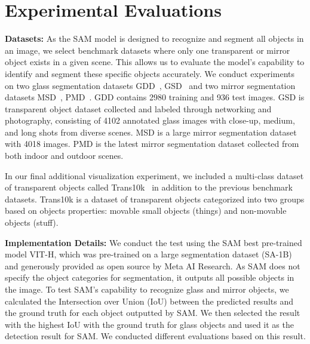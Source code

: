 \documentclass{article}
\begin{document}

\section{Experimental Evaluations}
\textbf{Datasets:}
As the SAM model is designed to recognize and segment all objects in an image, we select benchmark datasets where only one transparent or mirror object exists in a given scene. This allows us to evaluate the model's capability to identify and segment these specific objects accurately. We conduct experiments on two glass segmentation datasets GDD~\citep{mei2020don}, GSD~\citep{lin2021rich} and two mirror segmentation datasets MSD~\citep{yang2019my}, PMD~\citep{lin2020progressive}. GDD contains 2980 training and 936 test images. GSD is transparent object dataset collected and labeled through networking and photography, consisting of 4102 annotated glass images with close-up, medium, and long shots from diverse scenes. MSD is a large mirror segmentation dataset with 4018 images. 
PMD is the latest mirror segmentation dataset collected from both indoor and outdoor scenes.

In our final additional visualization experiment, we included a multi-class dataset of transparent objects called Trans10k~\citep{xie2020segmenting} in addition to the previous benchmark datasets. Trans10k is a dataset of transparent objects categorized into two groups based on objects properties: movable small objects (things) and non-movable objects (stuff).
 
\textbf{Implementation Details:}
We conduct the test using the SAM best pre-trained model VIT-H, which was pre-trained on a large segmentation dataset (SA-1B) and generously provided as open source by Meta AI Research. As SAM does not specify the object categories for segmentation, it outputs all possible objects in the image. To test SAM's capability to recognize glass and mirror objects, we calculated the Intersection over Union (IoU) between the predicted results and the ground truth for each object outputted by SAM. We then selected the result with the highest IoU with the ground truth for glass objects and used it as the detection result for SAM. We conducted different evaluations based on this result.
\end{document}
